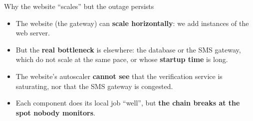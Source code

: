 \documentclass[10pt]{beamer}
\begin{document}
\begin{frame}{Why the website ``scales'' but the outage persists}
  \begin{center}
  \end{center}

  \vspace{0.3cm}
  \begin{itemize}
    \item The website (the gateway) can \textbf{scale horizontally}: we add instances of the web server.
    \item But the \textbf{real bottleneck} is elsewhere: the database or the SMS gateway, which do not scale at the same pace, or whose \textbf{startup time} is long.
    \item The website's autoscaler \textbf{cannot see} that the verification service is saturating, nor that the SMS gateway is congested.
    \item Each component does its local job ``well'', but \textbf{the chain breaks at the spot nobody monitors}.
  \end{itemize}
\end{frame}
\end{document}

